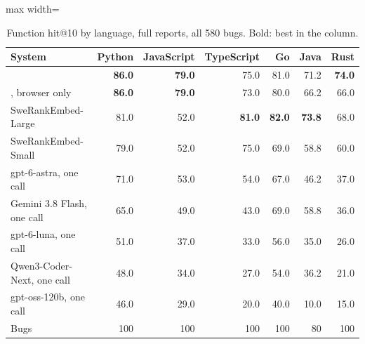 \begin{table}[t]
\centering
\small
\caption{Function hit@10 by language, full reports, all 580 bugs. Bold: best in the column.}
\label{tab:languages}
\begin{adjustbox}{max width=\linewidth}\begin{tabular}{lrrrrrr}
\toprule
System & Python & JavaScript & TypeScript & Go & Java & Rust \\
\midrule
\toolgpu{} & \textbf{86.0} & \textbf{79.0} & 75.0 & 81.0 & 71.2 & \textbf{74.0} \\
\tool{}, browser only & \textbf{86.0} & \textbf{79.0} & 73.0 & 80.0 & 66.2 & 66.0 \\
SweRankEmbed-Large & 81.0 & 52.0 & \textbf{81.0} & \textbf{82.0} & \textbf{73.8} & 68.0 \\
SweRankEmbed-Small & 79.0 & 52.0 & 75.0 & 69.0 & 58.8 & 60.0 \\
gpt-6-astra, one call & 71.0 & 53.0 & 54.0 & 67.0 & 46.2 & 37.0 \\
Gemini 3.8 Flash, one call & 65.0 & 49.0 & 43.0 & 69.0 & 58.8 & 36.0 \\
gpt-6-luna, one call & 51.0 & 37.0 & 33.0 & 56.0 & 35.0 & 26.0 \\
Qwen3-Coder-Next, one call & 48.0 & 34.0 & 27.0 & 54.0 & 36.2 & 21.0 \\
gpt-oss-120b, one call & 46.0 & 29.0 & 20.0 & 40.0 & 10.0 & 15.0 \\
\midrule
Bugs & 100 & 100 & 100 & 100 & 80 & 100 \\
\bottomrule
\end{tabular}\end{adjustbox}
\end{table}
